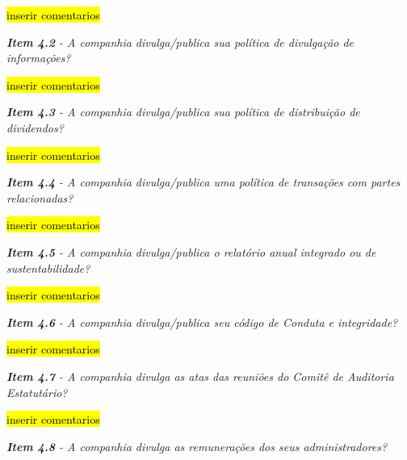 \hl{inserir comentarios}

\begin{framed}
\noindent\textit{\textbf{Item 4.2} - A companhia divulga/publica sua política de divulgação de informações?}
\end{framed}

\hl{inserir comentarios}

\begin{framed}
\noindent\textit{\textbf{Item 4.3} - A companhia divulga/publica sua política de distribuição de dividendos?}
\end{framed}

\hl{inserir comentarios}


\begin{framed}
\noindent\textit{\textbf{Item 4.4} - A companhia divulga/publica uma política de transações com partes relacionadas?}
\end{framed}

\hl{inserir comentarios}

\begin{framed}
\noindent\textit{\textbf{Item 4.5} - A companhia divulga/publica o relatório anual integrado ou de sustentabilidade?}
\end{framed}

\hl{inserir comentarios}

\begin{framed}
\noindent\textit{\textbf{Item 4.6} - A companhia divulga/publica seu código de Conduta e integridade?}
\end{framed}

\hl{inserir comentarios}


\begin{framed}
\noindent\textit{\textbf{Item 4.7} - A companhia divulga as atas das reuniões do Comitê de Auditoria Estatutário?}
\end{framed}

\hl{inserir comentarios}

\begin{framed}
\noindent\textit{\textbf{Item 4.8} - A companhia divulga as remunerações dos seus administradores?}
\end{framed}

